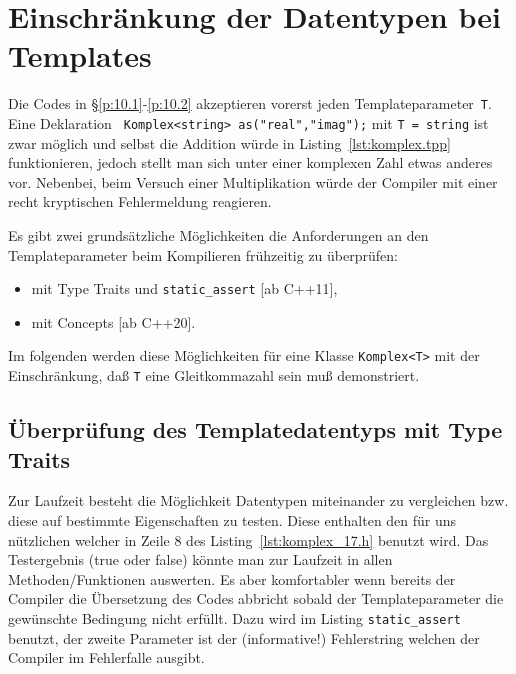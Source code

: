 \section{Einschränkung der Datentypen bei Templates}
\label{p:10.3}
Die Codes in \S\ref{p:10.1}-\ref{p:10.2} akzeptieren vorerst jeden Templateparameter~\verb|T|.
Eine Deklaration \verb| Komplex<string> as("real","imag");| mit \verb|T = string| ist zwar möglich und selbst die Addition würde 
in Listing~\ref{lst:komplex.tpp} funktionieren, jedoch stellt man sich unter einer komplexen Zahl etwas anderes vor.
Nebenbei, beim Versuch einer Multiplikation würde der Compiler mit einer recht kryptischen Fehlermeldung reagieren.

Es gibt zwei grundsätzliche Möglichkeiten die Anforderungen an den Templateparameter beim 
Kompilieren frühzeitig zu überprüfen:
\begin{itemize}
 \item mit Type Traits und \texttt{static\_assert} [ab C++11],
 \item mit Concepts [ab C++20].
\end{itemize}
Im folgenden werden diese Möglichkeiten für eine Klasse \verb|Komplex<T>| mit 
der Einschränkung, daß \texttt{T} eine Gleitkommazahl sein muß demonstriert.


\subsection{Überprüfung des Templatedatentyps mit Type Traits}
\label{p:10.3.1}
%
Zur Laufzeit besteht die Möglichkeit Datentypen miteinander zu vergleichen bzw. diese 
auf bestimmte Eigenschaften zu testen. 
Diese  
enthalten den für uns nützlichen 
welcher in Zeile 8 des Listing~\ref{lst:komplex_17.h} benutzt wird. 
Das Testergebnis (true oder false) könnte man zur Laufzeit in allen Methoden/Funktionen auswerten.
%
%
Es aber komfortabler wenn bereits der Compiler die Übersetzung des Codes abbricht sobald 
der Templateparameter die gewünschte Bedingung nicht erfüllt. 
Dazu wird im Listing \verb|static_assert| benutzt, der zweite Parameter ist der (informative!) Fehlerstring 
welchen der Compiler im Fehlerfalle ausgibt.

